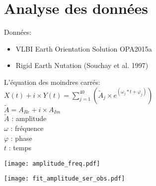 \section{Analyse des données}

\begin{frame}
Données: \\
	\begin{itemize}
		\item VLBI Earth Orientation Solution OPA2015a	
		\item Rigid Earth Nutation (Souchay et al. 1997)
	\end{itemize}
	\vspace{0.5cm}
	L'équation des moindres carrés: \\
	$X(t) + i \times Y(t) = \sum\limits_{j=1}^{40} (\widetilde{A}_{j} \times e^{(\omega_{j}*t + \varphi_{j})})$ \\
	$\widetilde{A} = A_{Re} + i \times A_{Im}$ \\

	\vspace{0.5cm}
	$\widetilde{A}$ : amplitude \\
	$\omega$ : fréquence \\
	$\varphi$ : phase \\
	$t$ : temps
\end{frame}

\begin{frame}
	\begin{center}
		\texttt{[image: amplitude\_freq.pdf]}
	\end{center}
\end{frame}

\begin{frame}
	\begin{center}
		\texttt{[image: fit\_amplitude\_ser\_obs.pdf]}
	\end{center} 
\end{frame}

